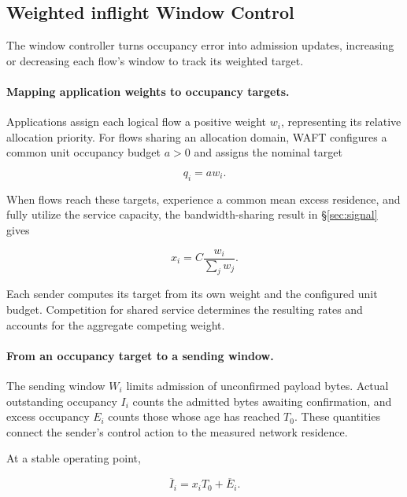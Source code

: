 \subsection{Weighted inflight Window Control}
\label{sec:window}

The window controller turns occupancy error into admission updates, increasing or decreasing each flow's window to track its weighted target.

\paragraph{Mapping application weights to occupancy targets.}

Applications assign each logical flow a positive weight \(w_i\), representing its relative allocation priority. For flows sharing an allocation domain, WAFT configures a common unit occupancy budget \(a>0\) and assigns the nominal target

\begin{equation}
\label{eq:design-15}
\boxed{
q_i=aw_i.
}
\end{equation}

When flows reach these targets, experience a common mean excess residence, and fully utilize the service capacity, the bandwidth-sharing result in \S\ref{sec:signal} gives

\begin{equation}
\label{eq:design-16}
x_i=C\frac{w_i}{\sum_jw_j}.
\end{equation}

Each sender computes its target from its own weight and the configured unit budget. Competition for shared service determines the resulting rates and accounts for the aggregate competing weight.

\paragraph{From an occupancy target to a sending window.}

The sending window \(W_i\) limits admission of unconfirmed payload bytes. Actual outstanding occupancy \(I_i\) counts the admitted bytes awaiting confirmation, and excess occupancy \(E_i\) counts those whose age has reached \(T_0\). These quantities connect the sender's control action to the measured network residence.

At a stable operating point,

\begin{equation}
\label{eq:design-17}
\overline I_i=x_iT_0+\overline E_i.
\end{equation}

